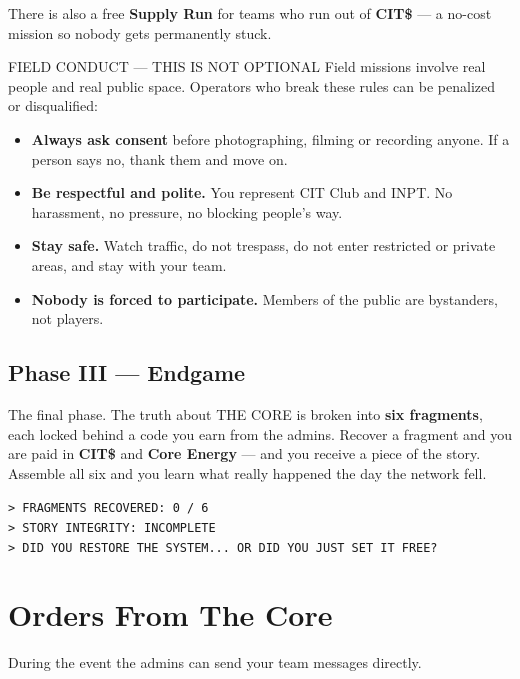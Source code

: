 \documentclass[11pt]{article}
\newcommand{\cit}{\textbf{\color{warn}CIT\$}}
\newcommand{\nrg}{\textbf{\color{info}Core Energy}}
\begin{document}
There is also a free \textbf{Supply Run} for teams who run out of \cit{} — a
no-cost mission so nobody gets permanently stuck.

\begin{alertbox}{FIELD CONDUCT — THIS IS NOT OPTIONAL}
Field missions involve real people and real public space. Operators who break
these rules can be penalized or disqualified:
\begin{itemize}
  \item \textbf{Always ask consent} before photographing, filming or recording
        anyone. If a person says no, thank them and move on.
  \item \textbf{Be respectful and polite.} You represent CIT Club and INPT.
        No harassment, no pressure, no blocking people's way.
  \item \textbf{Stay safe.} Watch traffic, do not trespass, do not enter
        restricted or private areas, and stay with your team.
  \item \textbf{Nobody is forced to participate.} Members of the public are
        bystanders, not players.
\end{itemize}
\end{alertbox}

\subsection{Phase III — Endgame}
The final phase. The truth about THE CORE is broken into \textbf{six
fragments}, each locked behind a code you earn from the admins. Recover a
fragment and you are paid in \cit{} and \nrg{} — and you receive a piece of
the story. Assemble all six and you learn what really happened the day the
network fell.

\begin{terminal}
\color{term!80}
\texttt{> FRAGMENTS RECOVERED: 0 / 6}\\
\texttt{> STORY INTEGRITY: INCOMPLETE}\\
\color{alert}\texttt{> DID YOU RESTORE THE SYSTEM... OR DID YOU JUST SET IT FREE?}
\end{terminal}

\clearpage
\section{Orders From The Core}
During the event the admins can send your team messages directly.
\end{document}
